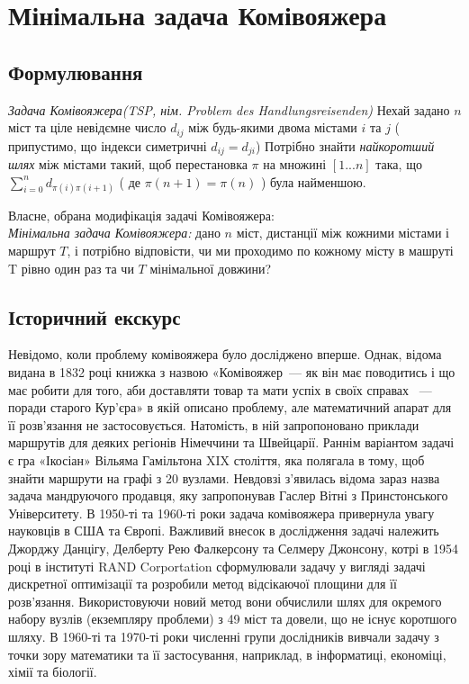 
\chapter{Мінімальна задача Комівояжера}
\label{chap:review}

\section{Формулювання}

\emph{ Задача Комівояжера(TSP, нім. Problem des Handlungsreisenden) }
Нехай задано $n$ міст та ціле невідємне число $d_{ij}$ між будь-якими
двома містами $i$ та $j$ ( припустимо, що індекси симетричні $d_{ij} = d_{ji}$)
Потрібно знайти \emph{найкоротший шлях} між містами такий, щоб перестановка 
$\pi$ на множині $[1...n]$ така, що $\sum\limits_{i = 0}^{n}{d_{\pi(i)\pi(i+1)}}$ ( де $\pi(n+1) = \pi(n)$ )
була найменшою.

Власне, обрана модифікація задачі Комівояжера: 
\\ \emph{Мінімальна задача Комівояжера: } дано $n$ міст, дистанції між кожними містами і
маршрут $T$, і потрібно відповісти, чи ми проходимо по кожному місту в машруті T рівно один раз
та чи $T$ мінімальної довжини?

\section{Історичний екскурс}

Невідомо, коли проблему комівояжера було досліджено вперше. Однак, відома видана в 1832 році книжка з назвою
«Комівояжер — як він має поводитись і що має робити для того, аби доставляти товар та мати успіх в своїх справах
 — поради старого Кур'єра» в якій описано проблему, але математичний апарат для її розв'язання не застосовується.
Натомість, в ній запропоновано приклади маршрутів для деяких регіонів Німеччини та Швейцарії. 
Раннім варіантом задачі є гра «Ікосіан» Вільяма Гамільтона XIX століття, яка полягала в тому,
щоб знайти маршрути на графі з 20 вузлами. Невдовзі з'явилась відома зараз назва задача мандруючого продавця,
яку запропонував Гаслер Вітні з Принстонського Університету.
В 1950-ті та 1960-ті роки задача комівояжера привернула увагу науковців в США та Європі. Важливий внесок в дослідження
задачі належить Джорджу Данцігу, Делберту Рею Фалкерсону та Селмеру Джонсону, котрі в 1954 році в інституті RAND Corportation
сформулювали задачу у вигляді задачі дискретної оптимізації та розробили метод відсікаючої площини для її розв'язання.
Використовуючи новий метод вони обчислили шлях для окремого набору вузлів (екземпляру проблеми) з 49 міст та довели,
що не існує коротшого шляху. В 1960-ті та 1970-ті роки численні групи дослідників вивчали задачу з точки зору математики
та її застосування, наприклад, в інформатиці, економіці, хімії та біології. 

